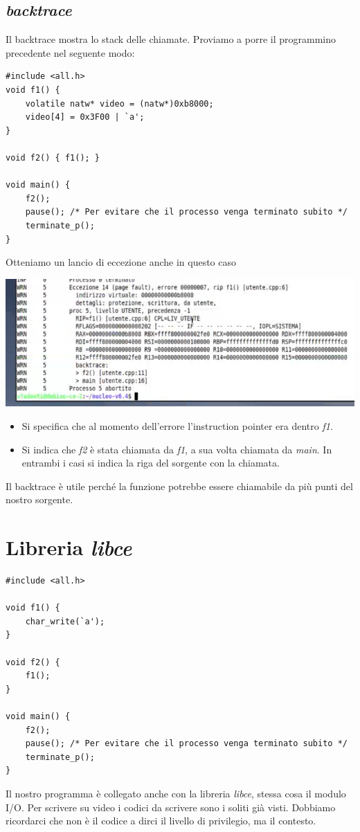 \documentclass[11pt]{report}
\theoremstyle{definition}
\begin{document}
\subsection{\emph{backtrace}} Il backtrace mostra lo stack delle chiamate. Proviamo a porre il programmino precedente nel seguente modo:
\small
\begin{verbatim}
#include <all.h>
void f1() {
    volatile natw* video = (natw*)0xb8000;
    video[4] = 0x3F00 | `a';
}

void f2() { f1(); }

void main() {
    f2();
    pause(); /* Per evitare che il processo venga terminato subito */
    terminate_p();
}
\end{verbatim}
\normalsize
Otteniamo un lancio di eccezione anche in questo caso
\begin{center}\includegraphics[scale=.85]{img/126.PNG}\end{center}
\begin{itemize}
\item Si specifica che al momento dell'errore l'instruction pointer era dentro \emph{f1}.
\item Si indica che \emph{f2} è stata chiamata da \emph{f1},  a sua volta chiamata da \emph{main}. In entrambi i casi si indica la riga del sorgente con la chiamata. 
\end{itemize}
Il backtrace è utile perché la funzione potrebbe essere chiamabile da più punti del nostro sorgente.

\section{Libreria \emph{libce}}
\small
\begin{verbatim}
#include <all.h>

void f1() {
    char_write(`a');
}

void f2() { 
    f1(); 
}

void main() {
    f2();
    pause(); /* Per evitare che il processo venga terminato subito */
    terminate_p();
}
\end{verbatim}
\normalsize
Il nostro programma è collegato anche con la libreria \emph{libce}, stessa cosa il modulo I/O. Per scrivere su video i codici da scrivere sono i soliti già visti. Dobbiamo ricordarci che non è il codice a dirci il livello di privilegio, ma il contesto.
\end{document}
